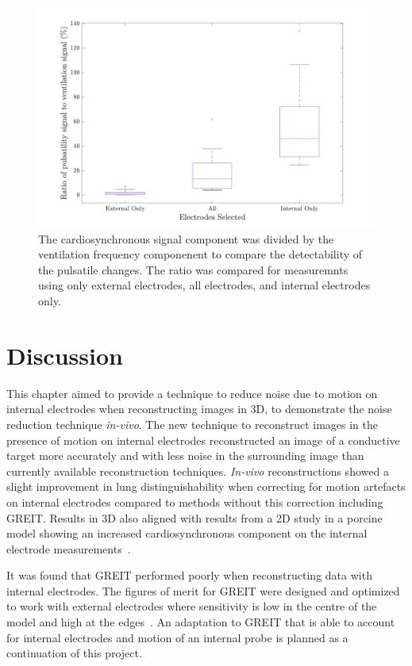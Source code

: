 \begin{figure}[H]
    \centering
	\includegraphics[width=\textwidth]{chapter7-internal_elec_motion/imgs/amplitude_ratio.pdf} 
	\caption[Amplitude of the cardiosynchronous signal]{\label{fig:amplitude_ratio} 
	The cardiosynchronous signal component was divided by the ventilation frequency 
	componenent to compare the detectability of the pulsatile changes. The ratio was compared 
	for measuremnts using only external electrodes, all electrodes, and internal electrodes only.}
\end{figure}

\section{Discussion}

This chapter aimed to provide a technique to reduce noise due to motion on internal
electrodes when reconstructing images in 3D, to demonstrate the noise reduction technique
\emph{in-vivo}. The new technique to reconstruct images in the presence of motion 
on internal electrodes reconstructed an image of a conductive target 
more accurately and with less noise in the surrounding image than currently
available reconstruction techniques. \emph{In-vivo}
reconstructions showed a slight improvement in lung distinguishability when correcting
for motion artefacts on internal electrodes compared to methods without this correction 
including GREIT. Results in 3D also aligned with results from a 2D study in a porcine 
model showing an increased cardiosynchronous component on the internal electrode 
measurements~\parencite{czaplik_application_2014}.

It was found that GREIT performed poorly when reconstructing data with internal electrodes.
The figures of merit for GREIT were designed and optimized to work with external electrodes 
where sensitivity is low in the centre of the model and high at the 
edges~\parencite{adler_greit_2009}. An adaptation to GREIT that is able to 
account for internal electrodes and motion of an internal probe is planned as a
continuation of this project.  

